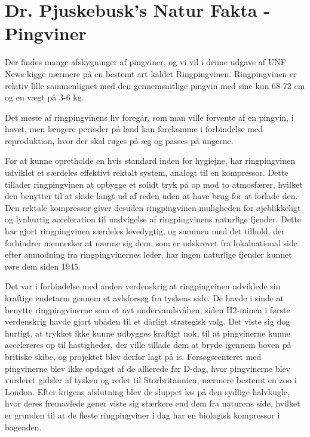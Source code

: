 \begin{minipage}[t]{170mm}
\vspace{3mm}
\section*{Dr. Pjuskebusk's Natur Fakta - Pingviner}

Der findes mange afskygninger af pingviner, og vi vil i denne udgave af UNF News kigge nærmere på en bestemt art kaldet Ringpingvinen. Ringpingvinen er relativ lille sammenlignet med den gennemsnitlige pingvin med sine kun 68-72 cm og en vægt på 3-6 kg.

Det meste af ringpingvinens liv foregår, som man ville forvente af en pingvin, i havet, men længere perioder på land kan forekomme i forbindelse med reproduktion, hvor der skal ruges på æg og passes på ungerne.

For at kunne opretholde en hvis standard inden for hygiejne, har ringpingvinen udviklet et særdeles effektivt rektalt system, analogt til en kompressor. Dette tillader ringpingvinen at opbygge et solidt tryk på op mod to atmosfærer, hvilket den benytter til at skide langt ud af reden uden at have brug for at forlade den. Den rektale kompressor giver desuden ringpingvinen muligheden for øjeblikkeligt og lynhurtig acceleration til undvigelse af ringpingvinens naturlige fjender. Dette har gjort ringpingvinen særdeles levedygtig, og sammen med det tilhold, der forhindrer mennesker at nærme sig dem, som er udskrevet fra lokalnational side efter anmodning fra ringpingvinernes leder, har ingen naturlige fjender kunnet røre dem siden 1945.

Det var i forbindelse med anden verdenskrig at ringpingvinen udviklede sin kraftige endetarm gennem et avlsforsøg fra tyskens side. De havde i sinde at benytte ringpingvinerne som et nyt undervandsvåben, siden H2-minen i første verdenskrig havde gjort ubåden til et dårligt strategisk valg. Det viste sig dog hurtigt, at trykket ikke kunne udbygges kraftigt nok, til at pingvinerne kunne accelereres op til hastigheder, der ville tillade dem at bryde igennem boven på britiske skibe, og projektet blev derfor lagt på is. Forsøgscenteret med pingvinerne blev ikke opdaget af de allierede før D-dag, hvor pingvinerne blev vurderet gidsler af tysken og redet til Storbritannien, nærmere bestemt en zoo i London. Efter krigens afslutning blev de sluppet løs på den sydlige halvkugle, hvor deres fremavlede gener viste sig stærkere end dem fra naturens side, hvilket er grunden til at de fleste ringpingviner i dag har en biologisk kompressor i bagenden.


\end{minipage}
